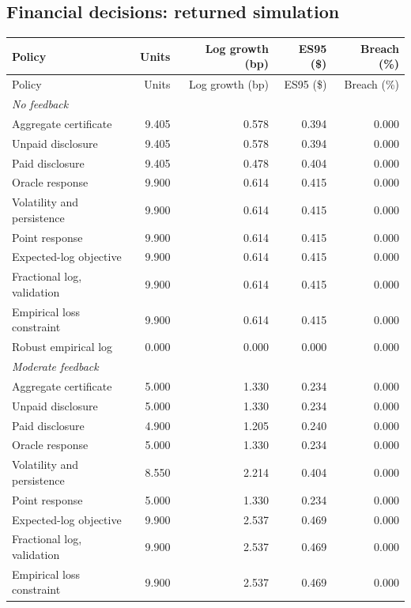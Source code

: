 \documentclass[12pt]{article}
\theoremstyle{definition}
\theoremstyle{remark}
\begin{document}
\subsection*{Financial decisions: returned simulation}
{\footnotesize\setlength{\tabcolsep}{4pt}\renewcommand{\arraystretch}{0.9}
\begin{longtable}{p{}rrrr}
\toprule
Policy & Units & Log growth (bp) & ES95 (\$) & Breach (\%)\\
\midrule
\endfirsthead
\toprule
Policy & Units & Log growth (bp) & ES95 (\$) & Breach (\%)\\
\midrule
\endhead
\multicolumn{5}{l}{\textit{No feedback}}\\
Aggregate certificate & 9.405 & 0.578 & 0.394 & 0.000\\
Unpaid disclosure & 9.405 & 0.578 & 0.394 & 0.000\\
Paid disclosure & 9.405 & 0.478 & 0.404 & 0.000\\
Oracle response & 9.900 & 0.614 & 0.415 & 0.000\\
Volatility and persistence & 9.900 & 0.614 & 0.415 & 0.000\\
Point response & 9.900 & 0.614 & 0.415 & 0.000\\
Expected-log objective & 9.900 & 0.614 & 0.415 & 0.000\\
Fractional log, validation & 9.900 & 0.614 & 0.415 & 0.000\\
Empirical loss constraint & 9.900 & 0.614 & 0.415 & 0.000\\
Robust empirical log & 0.000 & 0.000 & 0.000 & 0.000\\
\midrule
\multicolumn{5}{l}{\textit{Moderate feedback}}\\
Aggregate certificate & 5.000 & 1.330 & 0.234 & 0.000\\
Unpaid disclosure & 5.000 & 1.330 & 0.234 & 0.000\\
Paid disclosure & 4.900 & 1.205 & 0.240 & 0.000\\
Oracle response & 5.000 & 1.330 & 0.234 & 0.000\\
Volatility and persistence & 8.550 & 2.214 & 0.404 & 0.000\\
Point response & 5.000 & 1.330 & 0.234 & 0.000\\
Expected-log objective & 9.900 & 2.537 & 0.469 & 0.000\\
Fractional log, validation & 9.900 & 2.537 & 0.469 & 0.000\\
Empirical loss constraint & 9.900 & 2.537 & 0.469 & 0.000\\

\end{longtable}}
\end{document}
